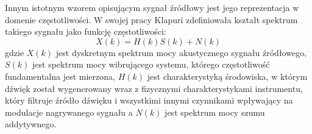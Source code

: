 \documentclass[12pt,a4paper,twoside]{mwart}
\begin{document}
Innym istotnym wzorem opisującym sygnał źródłowy jest jego reprezentacja w domenie częstotliwości. W swojej pracy Klapuri 
\cite[806]{Transcription:Klapuri:MultipleFundamentalFrequencyEstimation} 
zdefiniowała kształt spektrum takiego sygnału jako funkcję częstotliwości:
\begin{equation}\label{eq:Klapuri:spectrum}
X(k) = H(k)S(k) + N(k)
\end{equation}
gdzie $X(k)$ jest dyskretnym spektrum mocy akustycznego sygnału źródłowego, $S(k)$ jest spektrum mocy wibrującego systemu, którego częstotliwość fundamentalna jest mierzona, $H(k)$ jest charakterystyką środowiska, w którym dźwięk został wygenerowany wraz z fizycznymi charakterystykami instrumentu, który filtruje źródło dźwięku i wszystkimi innymi czynnikami wpływający na modulacje nagrywanego sygnału a $N(k)$ jest spektrum mocy szumu addytywnego. 
\end{document}
